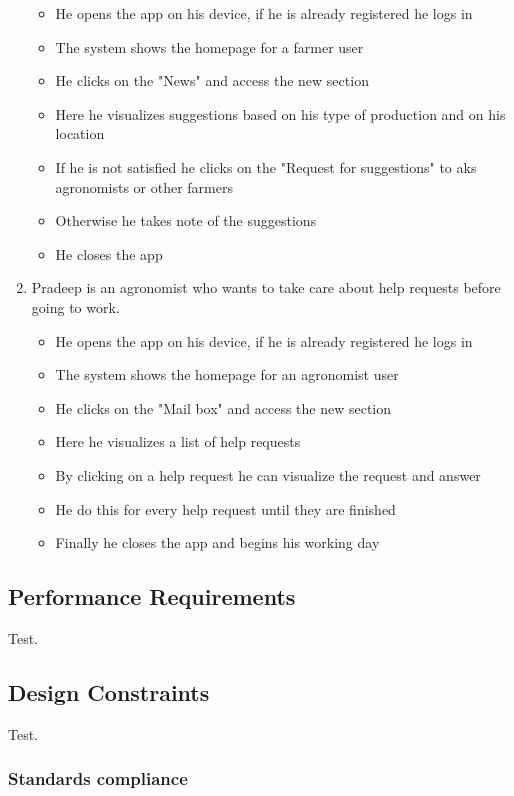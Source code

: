 \documentclass[table, 12pt]{article}
\begin{document}
\begin{enumerate}
    \begin{itemize}
        \item He opens the app on his device, if he is already registered he logs in
        \item The system shows the homepage for a farmer user
        \item He clicks on the "News" and access the new section
        \item Here he visualizes suggestions based on his type of production and on his location
        \item If he is not satisfied he clicks on the "Request for suggestions" to aks agronomists or other farmers
        \item Otherwise he takes note of the suggestions
        \item He closes the app
    \end{itemize}
    \item Pradeep is an agronomist who wants to take care about help requests before going to work.
    \begin{itemize}
        \item He opens the app on his device, if he is already registered he logs in
        \item The system shows the homepage for an agronomist user
        \item He clicks on the "Mail box" and access the new section
        \item Here he visualizes a list of help requests
        \item By clicking on a help request he can visualize the request and answer 
        \item He do this for every help request until they are finished
        \item Finally he closes the app and begins his working day
    \end{itemize} 
\end{enumerate}
\subsection{Performance Requirements}
Test.

\subsection{Design Constraints}
Test.

\subsubsection{Standards compliance}
\end{document}
